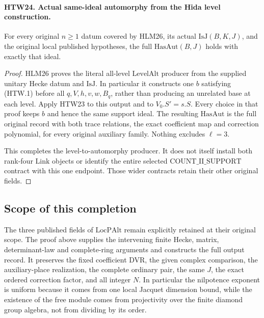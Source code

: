 \documentclass[11pt,a4paper]{article}
\numberwithin{equation}{section}
\theoremstyle{remark}\newtheorem{remark}[theorem]{Remark}
\begin{document}
\paragraph{HTW24. Actual same-ideal automorphy from the Hida level construction.}
\label{claim:HTW24}
For every original \(n\ge1\) datum covered by HLM26,
its actual \(\mathrm{IsJ}(B,K,J)\), and the original
local published hypotheses, the full
\(\mathrm{HasAut}(B,J)\) holds with exactly that ideal.
\begin{proof}
HLM26 proves the literal all-level
\(\mathrm{LevelAlt}\) producer from the supplied
unitary Hecke datum and \(\mathrm{IsJ}\).  In
particular it constructs one \(b\) satisfying
(HTW.1) before all \(q,V,h,v,w,B_q\), rather
than producing an unrelated base at each level.
Apply HTW23 to this output and to
\(V_0.S'=s.S\).  Every choice in that proof
keeps \(b\) and hence the same support ideal.
The resulting \(\mathrm{HasAut}\) is the full
original record with both trace relations,
the exact coefficient map and correction
polynomial, for every original auxiliary
family.  Nothing excludes \(\ell=3\).

This completes the level-to-automorphy producer.
It does not itself install both rank-four
\(\mathrm{Link}\) objects or identify the
entire selected \(\mathrm{COUNT\_II\_SUPPORT}\)
contract with this one endpoint.  Those wider
contracts retain their other original fields.
\end{proof}

\subsection{Scope of this completion}

The three published fields of \(\mathrm{LocPAlt}\)
remain explicitly retained at their original scope.
The proof above supplies the intervening finite
Hecke, matrix, determinant-law and complete-ring
arguments and constructs the full output record.
It preserves the fixed coefficient DVR, the
given complex comparison, the auxiliary-place
realization, the complete ordinary pair, the
same \(J\), the exact ordered correction factor,
and all integer \(N\).  In particular the
nilpotence exponent is uniform because it
comes from one local Jacquet dimension bound,
while the existence of the free module comes
from projectivity over the finite diamond
group algebra, not from dividing by its order.
\end{document}
